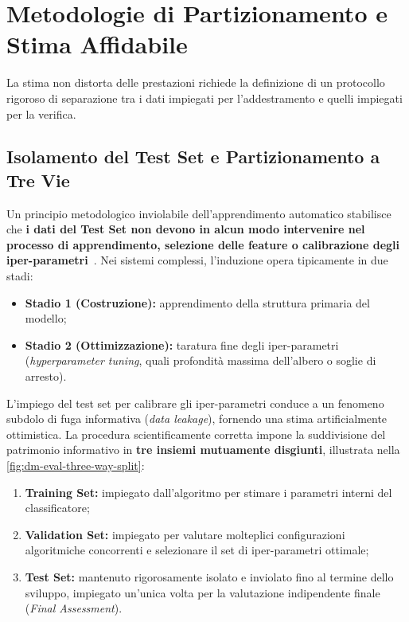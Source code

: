 \FloatBarrier
\section{Metodologie di Partizionamento e Stima Affidabile}
\label{sec:dm-evaluation-methods}

La stima non distorta delle prestazioni richiede la definizione di un protocollo rigoroso di separazione tra i dati impiegati per l'addestramento e quelli impiegati per la verifica.

\FloatBarrier
\subsection{Isolamento del Test Set e Partizionamento a Tre Vie}
\label{subsec:dm-three-way-split}

Un principio metodologico inviolabile dell'apprendimento automatico stabilisce che \textbf{i dati del Test Set non devono in alcun modo intervenire nel processo di apprendimento, selezione delle feature o calibrazione degli iper-parametri}~\cite{tan2018}.
Nei sistemi complessi, l'induzione opera tipicamente in due stadi:
\begin{itemize}
    \item \textbf{Stadio 1 (Costruzione):} apprendimento della struttura primaria del modello;
    \item \textbf{Stadio 2 (Ottimizzazione):} taratura fine degli iper-parametri (\textit{hyperparameter tuning}, quali profondità massima dell'albero o soglie di arresto).
\end{itemize}

L'impiego del test set per calibrare gli iper-parametri conduce a un fenomeno subdolo di fuga informativa (\textit{data leakage}), fornendo una stima artificialmente ottimistica. La procedura scientificamente corretta impone la suddivisione del patrimonio informativo in \textbf{tre insiemi mutuamente disgiunti}, illustrata nella \autoref{fig:dm-eval-three-way-split}:
\begin{enumerate}
    \item \textbf{Training Set:} impiegato dall'algoritmo per stimare i parametri interni del classificatore;
    \item \textbf{Validation Set:} impiegato per valutare molteplici configurazioni algoritmiche concorrenti e selezionare il set di iper-parametri ottimale;
    \item \textbf{Test Set:} mantenuto rigorosamente isolato e inviolato fino al termine dello sviluppo, impiegato un'unica volta per la valutazione indipendente finale (\textit{Final Assessment}).
\end{enumerate}

